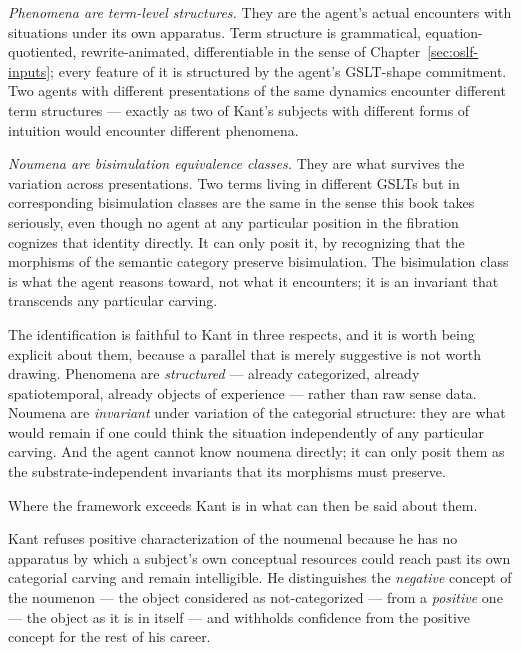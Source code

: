 \emph{Phenomena are term-level structures.}
They are the agent's actual encounters with situations under its
own apparatus.
Term structure is grammatical, equation-quotiented,
rewrite-animated, differentiable in the sense of
Chapter~\ref{sec:oslf-inputs}; every feature of it is structured by
the agent's GSLT-shape commitment.
Two agents with different presentations of the same dynamics
encounter different term structures --- exactly as two of Kant's
subjects with different forms of intuition would encounter
different phenomena.

\emph{Noumena are bisimulation equivalence classes.}
They are what survives the variation across presentations.
Two terms living in different GSLTs but in corresponding
bisimulation classes are the same in the sense this book takes
seriously, even though no agent at any particular position in the
fibration cognizes that identity directly.
It can only posit it, by recognizing that the morphisms of the
semantic category preserve bisimulation.
The bisimulation class is what the agent reasons toward, not what
it encounters; it is an invariant that transcends any particular
carving.

The identification is faithful to Kant in three respects, and it is
worth being explicit about them, because a parallel that is merely
suggestive is not worth drawing.
Phenomena are \emph{structured} --- already categorized, already
spatiotemporal, already objects of experience --- rather than raw
sense data.
Noumena are \emph{invariant} under variation of the categorial
structure: they are what would remain if one could think the
situation independently of any particular carving.
And the agent cannot know noumena directly; it can only posit them
as the substrate-independent invariants that its morphisms must
preserve.

Where the framework exceeds Kant is in what can then be said about
them.

Kant refuses positive characterization of the noumenal because he
has no apparatus by which a subject's own conceptual resources
could reach past its own categorial carving and remain
intelligible.
He distinguishes the \emph{negative} concept of the noumenon ---
the object considered as not-categorized --- from a \emph{positive}
one --- the object as it is in itself --- and withholds confidence
from the positive concept for the rest of his career.

